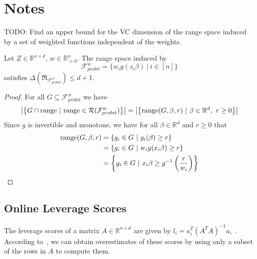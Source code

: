 \section{Notes}

TODO: Find an upper bound for the VC dimension of the range space
induced by a set of weighted functions independent of the weights.

\begin{lemma}
    Let $Z \in \mathbb{R}^{n \times d}$, $w \in \mathbb{R}^{n}_{>0}$.
    The range space induced by
    $$\mathcal{F}^w_{probit} = \{ w_i g(z_i \beta) \ | \ i \in [n] \}$$
    satisfies $\Delta(\mathfrak{R}_{\mathcal{F}^w_{probit}}) \leq d + 1$.
\end{lemma}
\begin{proof}
    For all $G \subseteq \mathcal{F}^w_{probit}$ we have
    \begin{equation*}
        \left| \left\{ G \cap \textup{range} \ | \
        \textup{range} \in \mathcal{R}(\mathcal{F}^w_{probit}) \right\} \right|
        =
        \left| \left\{ \textup{range}(G, \beta, r) \ | \
        \beta \in \mathbb{R}^d, \ r \geq 0 \right\} \right|
    \end{equation*}
    Since $g$ is invertible and monotone, we have for all
    $\beta \in \mathbb{R}^d$ and $r \geq 0$ that
    \begin{align*}
        \textup{range}(G, \beta, r)
         & = \left\{ g_i \in G \ |\ g_i(\beta) \geq r \right\}                                  \\
         & = \left\{ g_i \in G \ |\ w_i g(x_i \beta) \geq r \right\}                            \\
         & = \left\{ g_i \in G \ |\ x_i \beta \geq g^{-1} \left( \frac{r}{w_i} \right) \right\} \\
    \end{align*}
\end{proof}

\newpage

\subsection{Online Leverage Scores}

The leverage scores of a matrix $A \in \mathbb{R}^{n \times d}$
are given by $l_i = a_i^T (A^TA)^{-1}a_i$~\cite{online-row-sampling}.
According to~\cite{online-row-sampling}, we can obtain overestimates
of these scores by using only a subset of the rows in $A$ to compute them.

